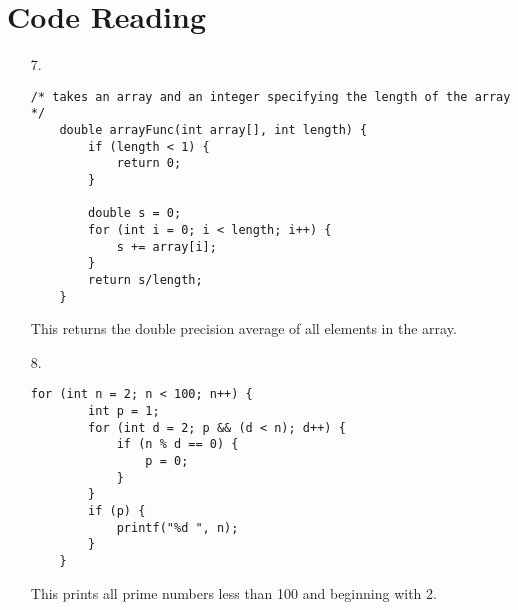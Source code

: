 \documentclass{article}
\begin{document}
\section*{Code Reading}
\begin{itemize}
	\item[7.] 
	\begin{lstlisting}[style=nonumbers]
	/* takes an array and an integer specifying the length of the array */
	double arrayFunc(int array[], int length) {
		if (length < 1) {
			return 0;
		}

		double s = 0;
		for (int i = 0; i < length; i++) {
			s += array[i];
		}
		return s/length;
	}
	\end{lstlisting}
	\begin{answer*}
		This returns the double precision average of all elements in the array.
		
	\end{answer*}
	
	\item[8.]
	\begin{lstlisting}[style=nonumbers]
	for (int n = 2; n < 100; n++) {
		int p = 1;
		for (int d = 2; p && (d < n); d++) {
			if (n % d == 0) {
				p = 0;
			}
		}
		if (p) {
			printf("%d ", n);
		}
	}
	\end{lstlisting}
	\begin{answer*}
		This prints all prime numbers less than 100 and beginning with 2.

	\end{answer*}
	
\end{itemize}
\end{document}
